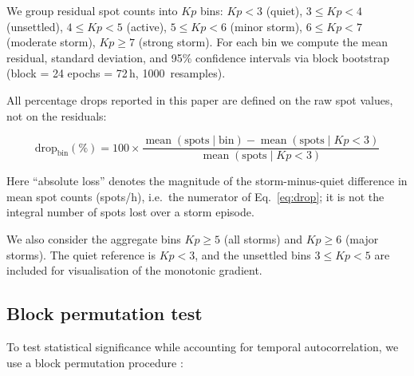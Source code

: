 \documentclass{agujournal2019}
\begin{document}
We group residual spot counts into $Kp$ bins: $Kp < 3$ (quiet),
$3 \le Kp < 4$ (unsettled), $4 \le Kp < 5$ (active),
$5 \le Kp < 6$ (minor storm), $6 \le Kp < 7$ (moderate storm),
$Kp \ge 7$ (strong storm). For each bin we compute the mean residual,
standard deviation, and 95\% confidence intervals via block bootstrap \citep{efron1993}
(block = 24 epochs = 72\,h, \SI{1000}{resamples}).

All percentage drops reported in this paper are defined on the raw
spot values, not on the residuals:

\begin{equation}
	\text{drop}_{\text{bin}}(\%) = 100 \times
	\frac{\operatorname{mean}(\text{spots} \mid \text{bin}) -
	\operatorname{mean}(\text{spots} \mid Kp < 3)}{\operatorname{mean}(\text{spots} \mid Kp < 3)}
	\label{eq:drop}
\end{equation}

Here ``absolute loss'' denotes the magnitude of the storm-minus-quiet
difference in mean spot counts (spots/h), i.e.\ the numerator of
Eq.~\eqref{eq:drop}; it is not the integral number of spots lost over a
storm episode.


We also consider the aggregate bins $Kp \ge 5$ (all storms) and
$Kp \ge 6$ (major storms). The quiet reference is $Kp < 3$, and the
unsettled bins $3 \le Kp < 5$ are included for visualisation of the
monotonic gradient.

\subsection{Block permutation test}

To test statistical significance while accounting for temporal
autocorrelation, we use a block permutation procedure
\citep{davison1997}:
\end{document}
